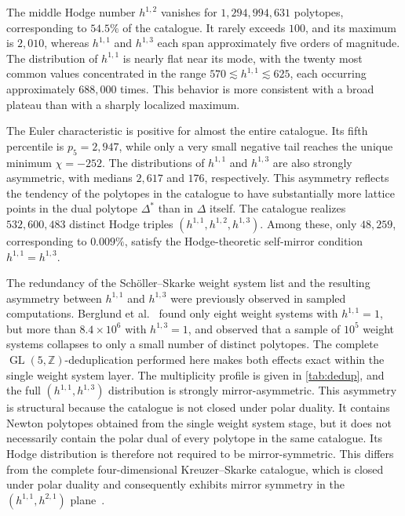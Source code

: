 \documentclass[appliedmath,article,submit,moreauthors]{Definitions/mdpi}
\newcommand{\Z}{\mathbb{Z}}
\newcommand{\GL}{\operatorname{GL}}
\begin{document}
The middle Hodge number \(h^{1,2}\) vanishes for \(1{,}294{,}994{,}631\)
polytopes, corresponding to \(54.5\%\) of the catalogue. It rarely exceeds
\(100\), and its maximum is \(2{,}010\), whereas \(h^{1,1}\) and \(h^{1,3}\)
each span approximately five orders of magnitude. The distribution of
\(h^{1,1}\) is nearly flat near its mode, with the twenty most common values
concentrated in the range \(570\lesssim h^{1,1}\lesssim625\), each occurring
approximately \(688{,}000\) times. This behavior is more consistent with a broad
plateau than with a sharply localized maximum.

The Euler characteristic is positive for almost the entire catalogue. Its fifth
percentile is \(p_5=2{,}947\), while only a very small negative tail reaches the
unique minimum \(\chi=-252\). The distributions of \(h^{1,1}\) and \(h^{1,3}\)
are also strongly asymmetric, with medians \(2{,}617\) and \(176\),
respectively. This asymmetry reflects the tendency of the polytopes in the
catalogue to have substantially more lattice points in the dual polytope
\(\Delta^*\) than in \(\Delta\) itself.
The catalogue realizes \(532{,}600{,}483\) distinct Hodge triples
\((h^{1,1},h^{1,2},h^{1,3})\). Among these, only \(48{,}259\), corresponding to
\(0.009\%\), satisfy the Hodge-theoretic self-mirror condition
\(h^{1,1}=h^{1,3}\).

The redundancy of the Sch\"oller--Skarke weight system list and the resulting
asymmetry between \(h^{1,1}\) and \(h^{1,3}\) were previously observed in
sampled computations. Berglund et al.~\cite{Berglund2024} found only eight
weight systems with \(h^{1,1}=1\), but more than \(8.4\times10^6\) with
\(h^{1,3}=1\), and observed that a sample of \(10^5\) weight systems collapses
to only a small number of distinct polytopes. The complete
\(\GL(5,\Z)\)-deduplication performed here makes both effects exact within the
single weight system layer. The multiplicity profile is given in
\cref{tab:dedup}, and the full \((h^{1,1},h^{1,3})\) distribution is strongly
mirror-asymmetric.
This asymmetry is structural because the catalogue is not closed under polar
duality. It contains Newton polytopes obtained from the single weight system
stage, but it does not necessarily contain the polar dual of every polytope in
the same catalogue. Its Hodge distribution is therefore not required to be
mirror-symmetric. This differs from the complete four-dimensional
Kreuzer--Skarke catalogue, which is closed under polar duality and consequently
exhibits mirror symmetry in the \((h^{1,1},h^{2,1})\)
plane~\cite{KreuzerSkarke2000,KreuzerCYData}.
\end{document}
